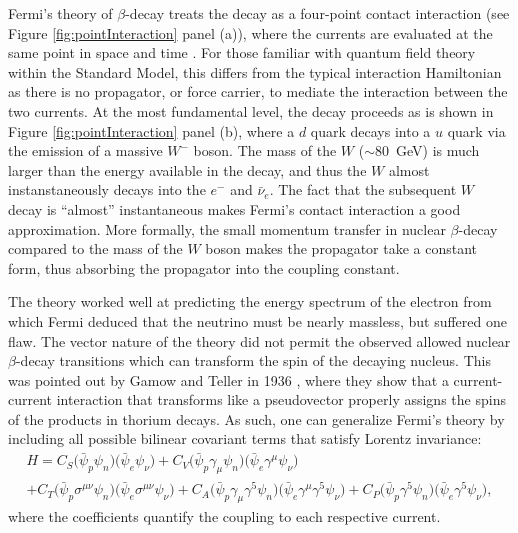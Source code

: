 Fermi's theory of $\beta$-decay treats the decay as a four-point contact interaction
(see Figure \ref{fig:pointInteraction} panel (a)), where
the currents are evaluated at the same point in space and time \cite{renton1990}. For those
familiar with quantum field theory within the Standard Model, this differs from the typical
interaction Hamiltonian as there is no propagator, or force carrier, to mediate the
interaction between the two currents. At the most fundamental level, the decay proceeds as is shown
in Figure \ref{fig:pointInteraction} panel (b), where a $d$ quark decays into a $u$ quark
via the emission of a massive $W^-$ boson. The mass of the $W$ ($\sim 80$~GeV) is much larger than
the energy available in the decay, and thus the $W$ almost instanstaneously decays into
the $e^-$ and $\bar{\nu}_e$. The fact that the subsequent $W$ decay is ``almost'' instantaneous
makes Fermi's contact interaction a good approximation. More formally, the small momentum transfer in nuclear
$\beta$-decay compared to the mass of the $W$ boson makes the propagator take a constant form, thus absorbing
the propagator into the coupling constant.

The theory
worked well at predicting the energy spectrum of the electron from which
Fermi deduced that the neutrino must be nearly massless, but suffered one flaw. The vector
nature of the theory did not permit the observed allowed nuclear $\beta$-decay transitions
which can transform the spin of the decaying nucleus. This was pointed out by Gamow and Teller in
1936 \cite{gamow1936}, where they show that a current-current interaction that transforms like
a pseudovector properly assigns the spins of the products in thorium decays. As such,
one can generalize Fermi's theory by including all possible bilinear covariant terms that
satisfy Lorentz invariance:
%
\begin{multline}
  H = C_S\big( \bar{\psi}_p \psi_n \big) \big( \bar{\psi}_e  \psi_\nu \big) 
  +C_V\big( \bar{\psi}_p \gamma_\mu \psi_n \big) \big( \bar{\psi}_e \gamma^\mu \psi_\nu \big) \\
  +C_T\big( \bar{\psi}_p \sigma^{\mu\nu} \psi_n \big) \big( \bar{\psi}_e \sigma^{\mu\nu} \psi_\nu \big) 
  +C_A\big( \bar{\psi}_p \gamma_\mu \gamma^5 \psi_n \big) \big( \bar{\psi}_e \gamma^\mu \gamma^5 \psi_\nu \big) 
  +C_P\big( \bar{\psi}_p  \gamma^5 \psi_n \big) \big( \bar{\psi}_e  \gamma^5 \psi_\nu \big),
  \label{eq:FermiFull}
\end{multline}
%
where the coefficients quantify the coupling to each respective current.


